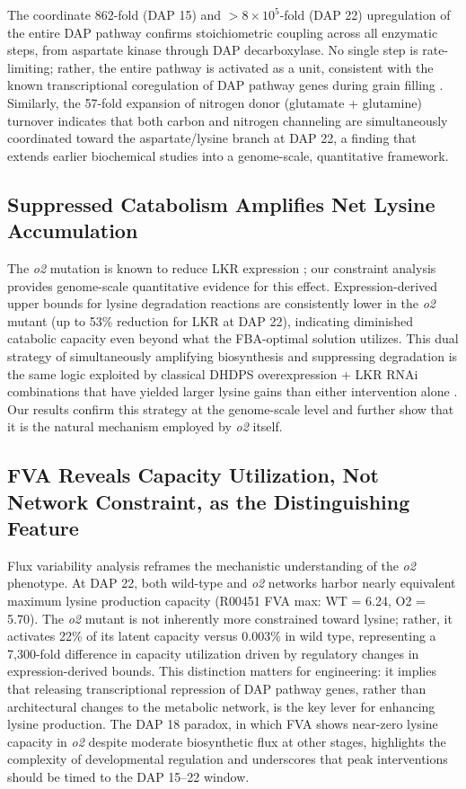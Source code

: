 \documentclass[12pt,a4paper]{article}
\begin{document}
The coordinate 862-fold (DAP 15) and $>8 \times 10^{5}$-fold (DAP 22) upregulation of the entire DAP pathway confirms stoichiometric coupling across all enzymatic steps, from aspartate kinase through DAP decarboxylase. No single step is rate-limiting; rather, the entire pathway is activated as a unit, consistent with the known transcriptional coregulation of DAP pathway genes during grain filling \citep{Galili2002, Azevedo2006}. Similarly, the 57-fold expansion of nitrogen donor (glutamate + glutamine) turnover indicates that both carbon and nitrogen channeling are simultaneously coordinated toward the aspartate/lysine branch at DAP 22, a finding that extends earlier biochemical studies into a genome-scale, quantitative framework.

\subsection{Suppressed Catabolism Amplifies Net Lysine Accumulation}

The \textit{o2} mutation is known to reduce LKR expression \citep{Kemper1999, Arruda2000}; our constraint analysis provides genome-scale quantitative evidence for this effect. Expression-derived upper bounds for lysine degradation reactions are consistently lower in the \textit{o2} mutant (up to 53\% reduction for LKR at DAP 22), indicating diminished catabolic capacity even beyond what the FBA-optimal solution utilizes. This dual strategy of simultaneously amplifying biosynthesis and suppressing degradation is the same logic exploited by classical DHDPS overexpression + LKR RNAi combinations that have yielded larger lysine gains than either intervention alone \citep{Houmard2007}. Our results confirm this strategy at the genome-scale level and further show that it is the natural mechanism employed by \textit{o2} itself.

\subsection{FVA Reveals Capacity Utilization, Not Network Constraint, as the Distinguishing Feature}

Flux variability analysis reframes the mechanistic understanding of the \textit{o2} phenotype. At DAP 22, both wild-type and \textit{o2} networks harbor nearly equivalent maximum lysine production capacity (R00451 FVA max: WT = 6.24, O2 = 5.70). The \textit{o2} mutant is not inherently more constrained toward lysine; rather, it activates 22\% of its latent capacity versus 0.003\% in wild type, representing a 7,300-fold difference in capacity utilization driven by regulatory changes in expression-derived bounds. This distinction matters for engineering: it implies that releasing transcriptional repression of DAP pathway genes, rather than architectural changes to the metabolic network, is the key lever for enhancing lysine production. The DAP 18 paradox, in which FVA shows near-zero lysine capacity in \textit{o2} despite moderate biosynthetic flux at other stages, highlights the complexity of developmental regulation and underscores that peak interventions should be timed to the DAP 15--22 window.
\end{document}
